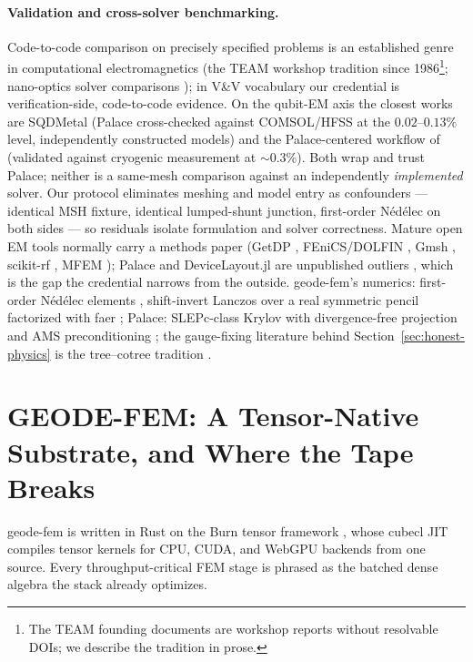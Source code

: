 \documentclass{anvil-paper}
\begin{document}
\paragraph{Validation and cross-solver benchmarking.}
Code-to-code comparison on precisely specified problems is an established
genre in computational electromagnetics (the TEAM workshop tradition
since 1986\footnote{The TEAM founding documents are workshop reports
without resolvable DOIs; we describe the tradition in prose.}; nano-optics
solver comparisons \citep{hoffmann2009comparison}); in V\&V vocabulary
\citep{roache1997quantification,oberkampf2010verification} our credential
is verification-side, code-to-code evidence. On the qubit-EM axis the
closest works are SQDMetal \citep{sommers2025open} (Palace cross-checked
against COMSOL/HFSS at the $0.02$--$0.13\%$ level, independently
constructed models) and the Palace-centered workflow of
\citet{ye2025electromagnetic} (validated against cryogenic measurement at
${\sim}0.3\%$). Both wrap and trust Palace; neither is a same-mesh
comparison against an independently \emph{implemented} solver. Our
protocol eliminates meshing and model entry as confounders --- identical
MSH fixture, identical lumped-shunt junction, first-order N\'ed\'elec on
both sides --- so residuals isolate formulation and solver correctness.
Mature open EM tools normally carry a methods paper (GetDP
\citep{dular1998general}, FEniCS/DOLFIN \citep{logg2010dolfin}, Gmsh
\citep{gmsh}, scikit-rf \citep{arsenovic2022scikit}, MFEM
\citep{mfem}); Palace and DeviceLayout.jl are unpublished outliers
\citep{palace,palace-blog,devicelayout,devicelayout-blog,
devicelayout-juliacon}, which is the gap the credential narrows from the
outside. geode-fem's numerics: first-order N\'ed\'elec elements
\citep{nedelec1980}, shift-invert Lanczos \citep{arpack} over a real
symmetric pencil factorized with faer \citep{kazdadi2026faer}; Palace:
SLEPc-class Krylov \citep{slepc} with divergence-free projection and AMS
preconditioning \citep{hiptmair-xu,
tzaniovkolevpanayotsvassilevski2018parallel}; the gauge-fixing literature
behind Section~\ref{sec:honest-physics} is the tree--cotree tradition
\citep{albanese1988solution,manges1995generalized}.

\section{GEODE-FEM: A Tensor-Native Substrate, and Where the Tape Breaks}
\label{sec:architecture}

geode-fem is written in Rust on the Burn tensor framework \citep{burn},
whose cubecl JIT compiles tensor kernels for CPU, CUDA, and WebGPU
backends from one source. Every throughput-critical FEM stage is phrased
as the batched dense algebra the stack already optimizes.
\end{document}
